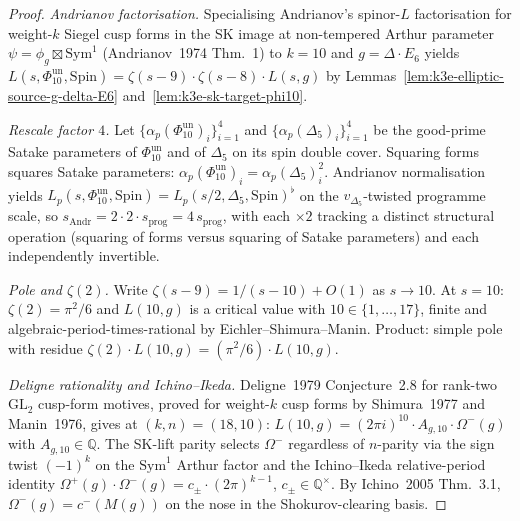 \begin{proof}
\emph{Andrianov factorisation.} Specialising Andrianov's spinor-$L$ factorisation for weight-$k$ Siegel cusp forms in the SK image at non-tempered Arthur parameter $\psi = \phi_g \boxtimes \mathrm{Sym}^1$ (Andrianov~1974 Thm.~1) to \(k = 10\) and \(g = \Delta \cdot E_6\) yields \(L(s, \Phi_{10}^{\mathrm{un}}, \mathrm{Spin}) = \zeta(s - 9) \cdot \zeta(s - 8) \cdot L(s, g)\) by Lemmas~\ref{lem:k3e-elliptic-source-g-delta-E6} and~\ref{lem:k3e-sk-target-phi10}.

\emph{Rescale factor $4$.} Let \(\{\alpha_p(\Phi_{10}^{\mathrm{un}})_i\}_{i = 1}^4\) and \(\{\alpha_p(\Delta_5)_i\}_{i = 1}^4\) be the good-prime Satake parameters of \(\Phi_{10}^{\mathrm{un}}\) and of \(\Delta_5\) on its spin double cover. Squaring forms squares Satake parameters: \(\alpha_p(\Phi_{10}^{\mathrm{un}})_i = \alpha_p(\Delta_5)_i^2\). Andrianov normalisation yields \(L_p(s, \Phi_{10}^{\mathrm{un}}, \mathrm{Spin}) = L_p(s/2, \Delta_5, \mathrm{Spin})^\flat\) on the \(v_{\Delta_5}\)-twisted programme scale, so \(s_{\mathrm{Andr}} = 2 \cdot 2 \cdot s_{\mathrm{prog}} = 4\,s_{\mathrm{prog}}\), with each \(\times 2\) tracking a distinct structural operation (squaring of forms versus squaring of Satake parameters) and each independently invertible.

\emph{Pole and $\zeta(2)$.} Write $\zeta(s - 9) = 1/(s - 10) + O(1)$ as $s \to 10$. At $s = 10$: $\zeta(2) = \pi^2/6$ and $L(10, g)$ is a critical value with $10 \in \{1, \ldots, 17\}$, finite and algebraic-period-times-rational by Eichler--Shimura--Manin. Product: simple pole with residue $\zeta(2) \cdot L(10, g) = (\pi^2/6) \cdot L(10, g)$.

\emph{Deligne rationality and Ichino--Ikeda.} Deligne~1979 Conjecture~2.8 for rank-two $\mathrm{GL}_2$ cusp-form motives, proved for weight-$k$ cusp forms by Shimura~1977 and Manin~1976, gives at $(k, n) = (18, 10)$: $L(10, g) = (2\pi i)^{10} \cdot A_{g, 10} \cdot \Omega^-(g)$ with $A_{g, 10} \in \mathbb{Q}$. The SK-lift parity selects $\Omega^-$ regardless of $n$-parity via the sign twist $(-1)^k$ on the $\mathrm{Sym}^1$ Arthur factor and the Ichino--Ikeda relative-period identity $\Omega^+(g) \cdot \Omega^-(g) = c_\pm \cdot (2\pi)^{k - 1}$, $c_\pm \in \mathbb{Q}^\times$. By Ichino~2005 Thm.~3.1, $\Omega^-(g) = c^-(M(g))$ on the nose in the Shokurov-clearing basis.


\end{proof}
